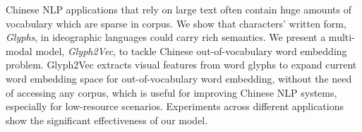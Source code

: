 Chinese NLP applications that rely on large text often contain huge amounts of vocabulary which are sparse in corpus. We show that characters' written form, \emph{Glyphs}, in ideographic languages could carry rich semantics. We present a multi-modal model, \emph{Glyph2Vec}, to tackle Chinese out-of-vocabulary word embedding problem. Glyph2Vec extracts visual features from word glyphs to expand current word embedding space for out-of-vocabulary word embedding, without the need of accessing any corpus, which is useful for improving Chinese NLP systems, especially for low-resource scenarios. Experiments across different applications show the significant effectiveness of our model.
